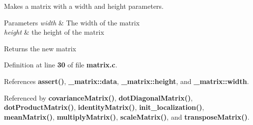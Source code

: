 Makes a matrix with a width and height parameters. 


\begin{DoxyParams}{Parameters}
{\em width} & The width of the matrix \\
\hline
{\em height} & the height of the matrix \\
\hline
\end{DoxyParams}
\begin{DoxyReturn}{Returns}
the new matrix 
\end{DoxyReturn}


Definition at line \textbf{ 30} of file \textbf{ matrix.\+c}.



References \textbf{ assert()}, \textbf{ \+\_\+matrix\+::data}, \textbf{ \+\_\+matrix\+::height}, and \textbf{ \+\_\+matrix\+::width}.



Referenced by \textbf{ covariance\+Matrix()}, \textbf{ dot\+Diagonal\+Matrix()}, \textbf{ dot\+Product\+Matrix()}, \textbf{ identity\+Matrix()}, \textbf{ init\+\_\+localization()}, \textbf{ mean\+Matrix()}, \textbf{ multiply\+Matrix()}, \textbf{ scale\+Matrix()}, and \textbf{ transpose\+Matrix()}.


